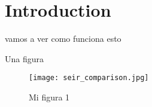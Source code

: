 \section{Introduction}

vamos a ver como funciona esto

Una figura

\begin{figure}[htb]
\centering
\texttt{[image: seir\_comparison.jpg]}
\caption{Mi figura 1}
\label{fig:seir1}
\end{figure}

